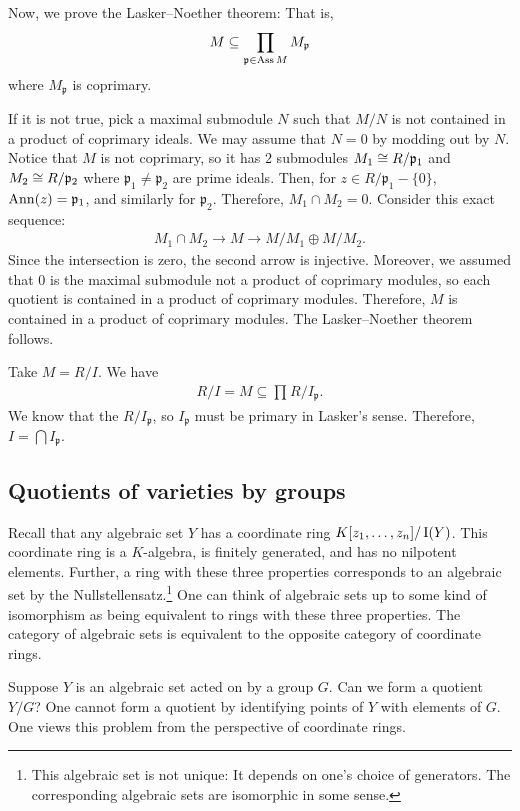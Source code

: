 \documentclass [11 pt, oneside] {article}
\begin{document}
Now, we prove the Lasker--Noether theorem: That is, 
\begin{align*}
	M\subseteq \prod_{\mathfrak{p} \in \operatorname{Ass} M} M_{\mathfrak{p}}
\end{align*}
where $M_{\mathfrak{p}}$ is coprimary.  

If it is not true, pick a maximal submodule $N$ such that $M/N$ is not contained in a product of coprimary ideals. We may assume that $N=0$ by modding out by $N$. Notice that $M$ is not coprimary, so it has $2$ submodules $M_1\cong R/\mathfrak{p}_1$ and $M_2\cong R/\mathfrak{p}_2$ where $\mathfrak{p}_1\ne \mathfrak{p}_2$ are prime ideals. Then, for $z\in R/\mathfrak{p}_1- \{0\}$, $\operatorname{Ann}(z)= \mathfrak{p}_1$, and similarly for $\mathfrak{p}_2$. Therefore, $M_1\cap M_2=0$. Consider this exact sequence:
\begin{align*}
	M_1\cap M_2 \longrightarrow M\longrightarrow M/M_1 \oplus M/M_2.
\end{align*}
Since the intersection is zero, the second arrow is injective. Moreover, we assumed that $0$ is the maximal submodule not a product of coprimary modules, so each quotient is contained in a product of coprimary modules. Therefore, $M$ is contained in a product of coprimary modules. The Lasker--Noether theorem follows.

Take $M=R/I$. We have 
\begin{align*}
	R/I = M \subseteq \prod_{} R/I_{\mathfrak{p}}.
\end{align*}
We know that the $R/I_{\mathfrak{p}}$, so $I_{\mathfrak{p}}$ must be primary in Lasker's sense. Therefore, $I=\bigcap I_{\mathfrak{p}}$.

\subsection{Quotients of varieties by groups}
Recall that any algebraic set $Y$ has a coordinate ring $K[z_1,\hdots, z_n]/\operatorname{I}(Y)$. This coordinate ring is a $K$-algebra, is finitely generated, and has no nilpotent elements. Further, a ring with these three properties corresponds to an algebraic set by the Nullstellensatz.\footnote{This algebraic set is not unique: It depends on one's choice of generators. The corresponding algebraic sets are isomorphic in some sense.} One can think of algebraic sets up to some kind of isomorphism as being equivalent to rings with these three properties. The category of algebraic sets is equivalent to the opposite category of coordinate rings. 

Suppose $Y$ is an algebraic set acted on by a group $G$. Can we form a quotient $Y/G$? One cannot form a quotient by identifying points of $Y$ with elements of $G$. One views this problem from the perspective of coordinate rings. 
\end{document}
